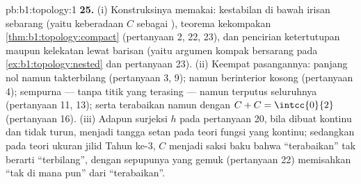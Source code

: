 \begin{solution}{pb:b1:topology:1}
\textbf{25.} (i) Konstruksinya memakai: kestabilan 
di bawah irisan sebarang (yaitu keberadaan $C$ sebagai ), teorema kekompakan \cref{thm:b1:topology:compact}
(pertanyaan 2, 22, 23), dan pencirian ketertutupan maupun
kelekatan lewat barisan (yaitu argumen kompak bersarang pada
\cref{ex:b1:topology:nested} dan pertanyaan 23). (ii) Keempat
pasangannya: panjang nol namun takterbilang (pertanyaan 3, 9); 
namun berinterior kosong (pertanyaan 4); sempurna --- tanpa titik
yang terasing --- namun terputus seluruhnya (pertanyaan 11, 13);
serta terabaikan namun dengan $C + C = \intcc{0}{2}$ (pertanyaan 16). (iii)
Adapun surjeksi $h$ pada pertanyaan 20, bila dibuat kontinu dan
tidak turun, menjadi tangga setan pada teori
fungsi yang kontinu; sedangkan pada teori ukuran jilid Tahun ke-3,
$C$ menjadi saksi baku bahwa ``terabaikan'' tak berarti
``terbilang'', dengan sepupunya yang gemuk (pertanyaan 22) memisahkan
``tak  di mana pun'' dari ``terabaikan''.

\end{solution}
